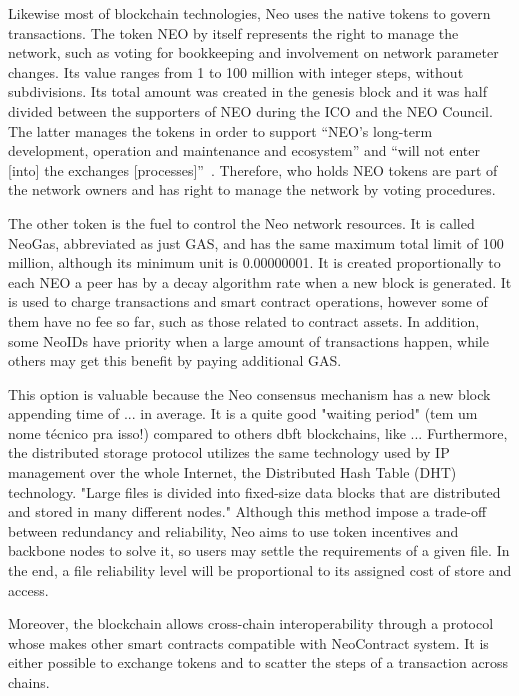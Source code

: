 Likewise most of blockchain technologies, Neo uses the native tokens to govern transactions.
The token NEO by itself represents the right to manage the network, such as voting for bookkeeping and involvement on network parameter changes.
Its value ranges from 1 to 100 million with integer steps, without subdivisions.
Its total amount was created in the genesis block and it was half divided between the supporters of NEO during the ICO and the NEO Council.
The latter manages the tokens in order to support ``NEO's long-term development, operation and maintenance and ecosystem'' and ``will not enter [into] the exchanges [processes]''~\cite{neowp}.
Therefore, who holds NEO tokens are part of the network owners and has right to manage the network by voting procedures.

The other token is the fuel to control the Neo network resources.
It is called NeoGas, abbreviated as just GAS, and has the same maximum total limit of 100 million, although its minimum unit is 0.00000001.
It is created proportionally to each NEO a peer has by a decay algorithm rate when a new block is generated.
It is used to charge transactions and smart contract operations, however some of them have no fee so far, such as those related to contract assets.
In addition, some NeoIDs have priority when a large amount of transactions happen, while others may get this benefit by paying additional GAS.

This option is valuable because the Neo consensus mechanism has a new block appending time of ... in average.
It is a quite good "waiting period" (tem um nome técnico pra isso!) compared to others \gls{dbft} blockchains, like ...
Furthermore, the distributed storage protocol utilizes the same technology used by IP management over the whole Internet, the Distributed Hash Table (DHT) technology. %
"Large files is divided into fixed-size data blocks that are distributed and stored in many different nodes."\cite{neowp}
Although this method impose a trade-off between redundancy and reliability, Neo aims to use token incentives and backbone nodes to solve it, so users may settle the requirements of a given file.
In the end, a file reliability level will be proportional to its assigned cost of store and access.

Moreover, the blockchain allows cross-chain interoperability through a protocol whose makes other smart contracts compatible with NeoContract system.
It is either possible to exchange tokens and to scatter the steps of a transaction across chains.

